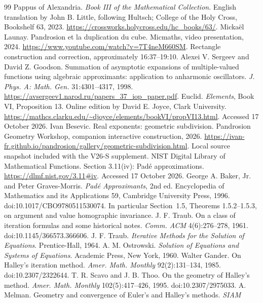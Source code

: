 \begin{thebibliography}{99}\small
{} Pappus of Alexandria. \emph{Book III of the Mathematical Collection}. English
translation by John B. Little, following Hultsch; College of the Holy Cross, Bookshelf 63, 2023.
\url{https://crossworks.holycross.edu/hc_books/63/}.
 Micka\"el Launay. Pandrosion et la duplication du cube. Micmaths, video presentation,
2024. \url{https://www.youtube.com/watch?v=7T4neM660SM}. Rectangle construction and correction,
approximately 16:37--19:10.
 Alexei V. Sergeev and David Z. Goodson. Summation of asymptotic expansions of
multiple-valued functions using algebraic approximants: application to anharmonic oscillators.
\emph{J. Phys. A: Math. Gen.} 31:4301--4317, 1998.
\url{https://avsergeev1.narod.ru/papers_37_iop_paper.pdf}.
 Euclid. \emph{Elements}, Book VI, Proposition 13. Online edition by David E. Joyce,
Clark University. \url{https://mathcs.clarku.edu/~djoyce/elements/bookVI/propVI13.html}. Accessed
17 October 2026.
 Ivan Besevic. Real exponents: geometric subdivision. Pandrosion Geometry Workshop,
companion interactive construction, 2026.
\url{https://ivan-fr.github.io/pandrosion/gallery/geometric-subdivision.html}. Local source snapshot
included with the V26-S supplement.
 NIST Digital Library of Mathematical Functions. Section 3.11(iv): Pad\'e
approximations. \url{https://dlmf.nist.gov/3.11#iv}. Accessed 17 October 2026.
 George A. Baker, Jr. and Peter Graves-Morris. \emph{Pad\'e Approximants}, 2nd ed.
Encyclopedia of Mathematics and its Applications 59, Cambridge University Press, 1996.
doi:10.1017/CBO9780511530074. In particular Section~1.5, Theorems 1.5.2--1.5.3, on argument and
value homographic invariance.
 J. F. Traub. On a class of iteration formulas and some historical notes.
\emph{Comm. ACM} 4(6):276--278, 1961. doi:10.1145/366573.366606.
 J. F. Traub. \emph{Iterative Methods for the Solution of Equations}. Prentice-Hall,
1964.
 A. M. Ostrowski. \emph{Solution of Equations and Systems of Equations}. Academic
Press, New York, 1960.
 Walter Gander. On Halley's iteration method. \emph{Amer. Math. Monthly}
92(2):131--134, 1985. doi:10.2307/2322644.
 T. R. Scavo and J. B. Thoo. On the geometry of Halley's method. \emph{Amer. Math.
Monthly} 102(5):417--426, 1995. doi:10.2307/2975033.
 A. Melman. Geometry and convergence of Euler's and Halley's methods. \emph{SIAM
}
\end{thebibliography}
